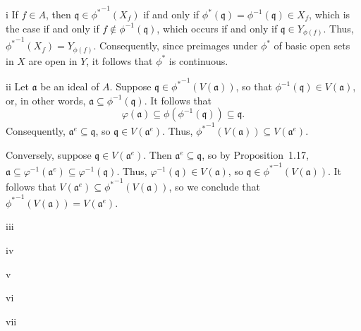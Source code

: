 \begin{partsolution}{i}
If \(f \in A\), then \(\mathfrak{q} \in {\phi^*}^{-1}(X_f)\) if and only if \(\phi^*(\mathfrak{q}) = \phi^{-1}(\mathfrak{q}) \in X_f\), which is the case if and only if \(f \notin \phi^{-1}(\mathfrak{q})\), which occurs if and only if \(\mathfrak{q} \in Y_{\phi(f)}\).
Thus, \({\phi^*}^{-1}(X_f) = Y_{\phi(f)}\).
Consequently, since preimages under \(\phi^*\) of basic open sets in \(X\) are open in \(Y\), it follows that \(\phi^*\) is continuous.
\end{partsolution}

\begin{partsolution}{ii}
Let \(\mathfrak{a}\) be an ideal of \(A\).
Suppose \(\mathfrak{q} \in {\phi^*}^{-1}(V(\mathfrak{a}))\), so that \(\phi^{-1}(\mathfrak{q}) \in V(\mathfrak{a})\), or, in other words, \(\mathfrak{a} \subseteq \phi^{-1}(\mathfrak{q})\).
It follows that
\begin{equation*}
\varphi(\mathfrak{a}) \subseteq \phi(\phi^{-1}(\mathfrak{q})) \subseteq \mathfrak{q}.
\end{equation*}
Consequently, \(\mathfrak{a}^e \subseteq \mathfrak{q}\), so \(\mathfrak{q} \in V(\mathfrak{a}^e)\).
Thus, \({\phi^*}^{-1}(V(\mathfrak{a})) \subseteq V(\mathfrak{a}^e)\).

Conversely, suppose \(\mathfrak{q} \in V(\mathfrak{a}^e)\).
Then \(\mathfrak{a}^e \subseteq \mathfrak{q}\), so by Proposition~1.17, \(\mathfrak{a} \subseteq \varphi^{-1}(\mathfrak{a}^e) \subseteq \varphi^{-1}(\mathfrak{q})\).
Thus, \(\varphi^{-1}(\mathfrak{q}) \in V(\mathfrak{a})\), so \(\mathfrak{q} \in {\phi^*}^{-1}(V(\mathfrak{a}))\).
It follows that \(V(\mathfrak{a}^e) \subseteq {\phi^*}^{-1}(V(\mathfrak{a}))\), so we conclude that \({\phi^*}^{-1}(V(\mathfrak{a})) = V(\mathfrak{a}^e)\).
\end{partsolution}

\begin{partsolution}{iii}

\end{partsolution}

\begin{partsolution}{iv}

\end{partsolution}

\begin{partsolution}{v}

\end{partsolution}

\begin{partsolution}{vi}

\end{partsolution}

\begin{partsolution}{vii}

\end{partsolution}